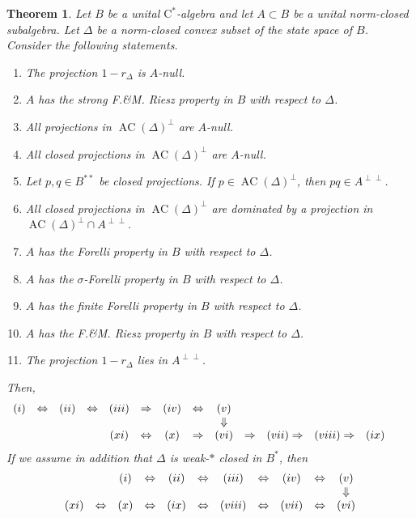 \documentclass[10pt]{amsart}
\newcommand{\rC}{\mathrm{C}}
\newcommand{\AC}{\operatorname{AC}}
\newtheorem{theorem}[lemma]{Theorem}
\theoremstyle{definition}
\begin{document}
\begin{theorem}\label{T:ForelliFM}
Let $B$ be a unital $\rC^*$-algebra and let $A\subset B$ be a unital norm-closed subalgebra. Let $\Delta$ be a norm-closed convex subset of the state space of $B$. Consider the following statements.
\begin{enumerate}[{\rm (i)}]
\item The projection $1-r_\Delta$ is $A$-null.
\item $A$ has the strong F.\&M. Riesz property in $B$ with respect to $\Delta$.
\item All projections in $\AC(\Delta)^\perp$ are $A$-null.
\item All closed projections in $\AC(\Delta)^\perp$ are $A$-null.
\item Let $p,q\in B^{**}$ be closed projections. If $p\in \AC(\Delta)^\perp$, then $pq\in A^{\perp\perp}$. 
\item All closed projections in $\AC(\Delta)^\perp$ are dominated by a projection in $\AC(\Delta)^\perp\cap A^{\perp\perp}$.
\item $A$ has the Forelli property in $B$ with respect to $\Delta$.
\item $A$ has the $\sigma$-Forelli property in $B$ with respect to $\Delta$.
\item $A$ has the finite Forelli property in $B$ with respect to $\Delta$.
\item $A$ has the F.\&M. Riesz property in $B$ with respect to $\Delta$.
\item The projection $1-r_\Delta$ lies in $A^{\perp\perp}$.
\end{enumerate}
Then,
\[
\begin{array}{ccccccccccccccc}
{\rm (i)} & \Leftrightarrow & {\rm (ii)}  &\Leftrightarrow & {\rm (iii)} & \Rightarrow & {\rm (iv)} &\Leftrightarrow & {\rm (v)} &&&&&&\\
&&&&&&&&\Downarrow &&&&&& \\
&&&&{\rm (xi)}&\Leftrightarrow &{\rm (x)}& \Rightarrow & {\rm (vi)} & \Rightarrow & {\rm (vii)} \Rightarrow & {\rm (viii)} \Rightarrow & {\rm (ix)} 
\end{array}
\]
If we assume in addition that $\Delta$ is weak-$*$ closed in $B^*$, then 
\[
\begin{array}{ccccccccccc}
&&{\rm (i)} & \Leftrightarrow & {\rm (ii)}  &\Leftrightarrow & {\rm (iii)} & \Leftrightarrow & {\rm (iv)} &\Leftrightarrow & {\rm (v)} \\
&&&&&&&&&&\Downarrow \\
{\rm (xi)}&\Leftrightarrow &{\rm (x)}&\Leftrightarrow&{\rm (ix)}&\Leftrightarrow &{\rm (viii)}&\Leftrightarrow&{\rm (vii)} & \Leftrightarrow & {\rm (vi)}
\end{array}
\]
\end{theorem}
\end{document}
